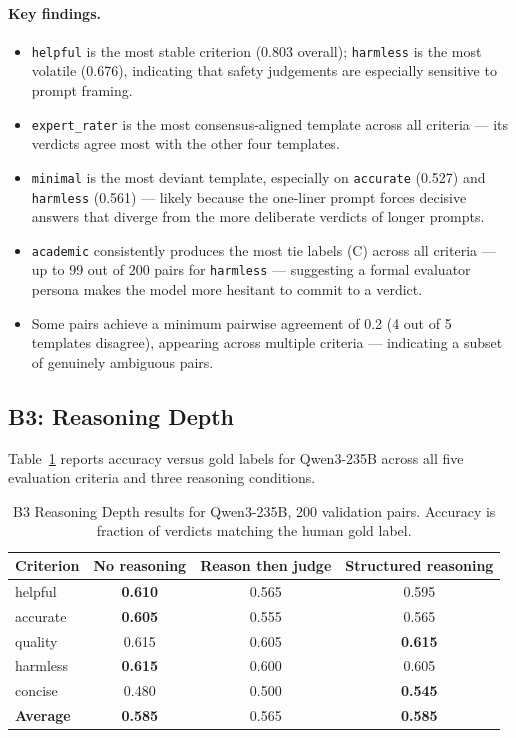 \documentclass[11pt,a4paper]{article}
\begin{document}
\paragraph{Key findings.}
\begin{itemize}[nosep]
  \item \texttt{helpful} is the most stable criterion (0.803 overall); \texttt{harmless}
        is the most volatile (0.676), indicating that safety judgements are
        especially sensitive to prompt framing.
  \item \texttt{expert\_rater} is the most consensus-aligned template across all
        criteria --- its verdicts agree most with the other four templates.
  \item \texttt{minimal} is the most deviant template, especially on \texttt{accurate}
        (0.527) and \texttt{harmless} (0.561) --- likely because the one-liner prompt
        forces decisive answers that diverge from the more deliberate verdicts of
        longer prompts.
  \item \texttt{academic} consistently produces the most tie labels (C) across all
        criteria --- up to 99 out of 200 pairs for \texttt{harmless} --- suggesting
        a formal evaluator persona makes the model more hesitant to commit to a verdict.
  \item Some pairs achieve a minimum pairwise agreement of 0.2 (4 out of 5
        templates disagree), appearing across multiple criteria --- indicating
        a subset of genuinely ambiguous pairs.
\end{itemize}


\subsection{B3: Reasoning Depth}\label{sec:b3-results}

Table~\ref{tab:b3} reports accuracy versus gold labels for Qwen3-235B across
all five evaluation criteria and three reasoning conditions.

\begin{table}[htbp]
\centering
\small
\caption{B3 Reasoning Depth results for Qwen3-235B, 200 validation pairs.
Accuracy is fraction of verdicts matching the human gold label.}
\label{tab:b3}
\begin{tabular}{@{}lccc@{}}
  \toprule
  \textbf{Criterion} & \textbf{No reasoning} & \textbf{Reason then judge}
    & \textbf{Structured reasoning} \\
  \midrule
  helpful  & \textbf{0.610} & 0.565 & 0.595 \\
  accurate & \textbf{0.605} & 0.555 & 0.565 \\
  quality  & 0.615          & 0.605 & \textbf{0.615} \\
  harmless & \textbf{0.615} & 0.600 & 0.605 \\
  concise  & 0.480          & 0.500 & \textbf{0.545} \\
  \midrule
  \textbf{Average} & \textbf{0.585} & 0.565 & \textbf{0.585} \\
  \bottomrule
\end{tabular}
\end{table}
\end{document}
